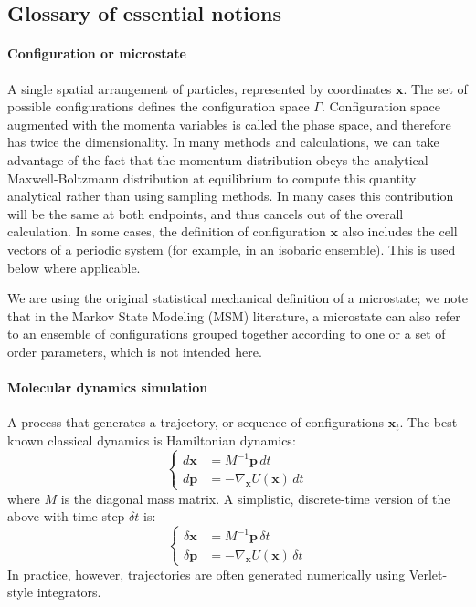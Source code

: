 \documentclass[9pt,review]{livecoms}
\newcommand{\vx}{\mathbf{x}}
\newcommand{\vp}{\mathbf{p}}
\begin{document}
\subsection{Glossary of essential notions}
\label{sec:glossary}

\hypertarget{ref:Microstate} {\paragraph{Configuration or microstate}}
A single spatial arrangement of particles, represented by coordinates $\vx$. The set of possible configurations defines the configuration space $\Gamma$.
Configuration space augmented with the momenta variables is called the phase space, and therefore has twice the dimensionality. In many methods and calculations, we can take advantage of the fact that the momentum distribution obeys the analytical Maxwell-Boltzmann distribution at equilibrium to compute this quantity analytical rather than using sampling methods.  In many cases this contribution will be the same at both endpoints, and thus cancels out of the overall calculation.
In some cases, the  definition of configuration $\vx$ also includes the cell vectors of a periodic system (for example, in an isobaric \hyperlink{ref:Ensemble} {ensemble}).  This is used below where applicable.

We are using the original statistical mechanical definition of a microstate; we note that in the Markov State Modeling (MSM) literature, a microstate can also refer to an ensemble of configurations grouped together according to one or a set of order parameters, which is not intended here.

\hypertarget{ref:MolecularDynamics}{\paragraph{Molecular dynamics simulation}}
A process that generates a trajectory, or sequence of configurations $\vx_t$.
The best-known classical dynamics is Hamiltonian dynamics:
\begin{equation}
\left\{
\begin{array}{ll}
    d\vx &= M^{-1} \vp \,  dt \\
    d\vp &= -\nabla_\vx U(\vx) \, dt
\end{array}
\right.
    \label{eq:md}
\end{equation}
where $M$ is the diagonal mass matrix.
A simplistic, discrete-time version of the above with time step $\delta t$ is:
\begin{equation}
\left\{
\begin{array}{ll}
    \delta \vx &= M^{-1} \vp \, \delta t \\
    \delta \vp &= -\nabla_\vx U(\vx) \, \delta t
    \label{eq:md_discrete}
\end{array}
\right.
\end{equation}
In practice, however, trajectories are often generated numerically using Verlet-style integrators.
\end{document}
